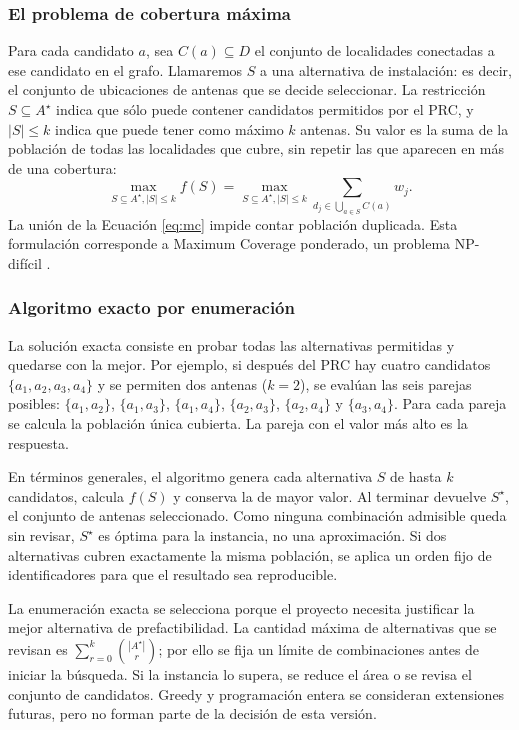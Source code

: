\documentclass[12pt,letterpaper]{article}
\begin{document}
\subsubsection{El problema de cobertura máxima}
Para cada candidato $a$, sea $C(a)\subseteq D$ el conjunto de localidades conectadas a ese candidato en el grafo. Llamaremos $S$ a una alternativa de instalación: es decir, el conjunto de ubicaciones de antenas que se decide seleccionar. La restricción $S\subseteq A^\star$ indica que sólo puede contener candidatos permitidos por el PRC, y $|S|\leq k$ indica que puede tener como máximo $k$ antenas. Su valor es la suma de la población de todas las localidades que cubre, sin repetir las que aparecen en más de una cobertura:
\begin{equation}
\max_{S\subseteq A^\star,|S|\leq k} f(S)
=\max_{S\subseteq A^\star,|S|\leq k} \sum_{d_j\in\bigcup_{a\in S}C(a)} w_j.
\label{eq:mc}
\end{equation}
La unión de la Ecuación \ref{eq:mc} impide contar población duplicada. Esta formulación corresponde a Maximum Coverage ponderado, un problema NP-difícil \cite{gareyjohnson,nemhauser}.

\subsubsection{Algoritmo exacto por enumeración}
La solución exacta consiste en probar todas las alternativas permitidas y quedarse con la mejor. Por ejemplo, si después del PRC hay cuatro candidatos $\{a_1,a_2,a_3,a_4\}$ y se permiten dos antenas ($k=2$), se evalúan las seis parejas posibles: $\{a_1,a_2\}$, $\{a_1,a_3\}$, $\{a_1,a_4\}$, $\{a_2,a_3\}$, $\{a_2,a_4\}$ y $\{a_3,a_4\}$. Para cada pareja se calcula la población única cubierta. La pareja con el valor más alto es la respuesta.

En términos generales, el algoritmo genera cada alternativa $S$ de hasta $k$ candidatos, calcula $f(S)$ y conserva la de mayor valor. Al terminar devuelve $S^\star$, el conjunto de antenas seleccionado. Como ninguna combinación admisible queda sin revisar, $S^\star$ es óptima para la instancia, no una aproximación. Si dos alternativas cubren exactamente la misma población, se aplica un orden fijo de identificadores para que el resultado sea reproducible.

La enumeración exacta se selecciona porque el proyecto necesita justificar la mejor alternativa de prefactibilidad. La cantidad máxima de alternativas que se revisan es $\sum_{r=0}^{k}\binom{|A^\star|}{r}$; por ello se fija un límite de combinaciones antes de iniciar la búsqueda. Si la instancia lo supera, se reduce el área o se revisa el conjunto de candidatos. Greedy y programación entera se consideran extensiones futuras, pero no forman parte de la decisión de esta versión.
\end{document}
